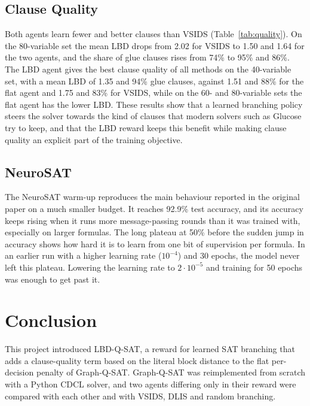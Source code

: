 \documentclass[11pt,a4paper]{article}
\begin{document}
\subsection{Clause Quality}

Both agents learn fewer and better clauses than VSIDS (Table~\ref{tab:quality}). On the 80-variable set the mean LBD drops from 2.02 for VSIDS to 1.50 and 1.64 for the two agents, and the share of glue clauses rises from 74\% to 95\% and 86\%. The LBD agent gives the best clause quality of all methods on the 40-variable set, with a mean LBD of 1.35 and 94\% glue clauses, against 1.51 and 88\% for the flat agent and 1.75 and 83\% for VSIDS, while on the 60- and 80-variable sets the flat agent has the lower LBD. These results show that a learned branching policy steers the solver towards the kind of clauses that modern solvers such as Glucose try to keep, and that the LBD reward keeps this benefit while making clause quality an explicit part of the training objective.

\subsection{NeuroSAT}

The NeuroSAT warm-up reproduces the main behaviour reported in the original paper on a much smaller budget. It reaches 92.9\% test accuracy, and its accuracy keeps rising when it runs more message-passing rounds than it was trained with, especially on larger formulas. The long plateau at 50\% before the sudden jump in accuracy shows how hard it is to learn from one bit of supervision per formula. In an earlier run with a higher learning rate ($10^{-4}$) and 30 epochs, the model never left this plateau. Lowering the learning rate to $2 \cdot 10^{-5}$ and training for 50 epochs was enough to get past it.

\section{Conclusion}
\label{sec:conclusion}

This project introduced LBD-Q-SAT, a reward for learned SAT branching that adds a clause-quality term based on the literal block distance to the flat per-decision penalty of Graph-Q-SAT. Graph-Q-SAT was reimplemented from scratch with a Python CDCL solver, and two agents differing only in their reward were compared with each other and with VSIDS, DLIS and random branching.
\end{document}
